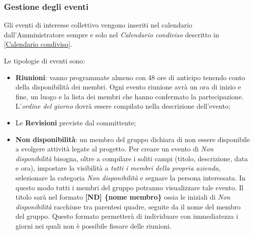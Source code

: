 		\subsubsection{Gestione degli eventi}
		
		Gli eventi di interesse collettivo vengono inseriti nel calendario dall'Amministratore sempre e solo nel \emph{Calendario condiviso} descritto in \ref{Calendario condiviso}.
		
		Le tipologie di eventi sono:
		\begin{itemize}
	  		\item \textbf{Riunioni}: vanno programmate almeno con 48 ore di anticipo tenendo conto della disponibilità dei membri. Ogni evento riunione avrà un ora di inizio e fine, un luogo e la lista dei membri che hanno confermato la partecipazione. L'\emph{ordine del giorno} dovrà essere compilato nella descrizione dell'evento;
	  		\item Le \textbf{Revisioni} previste dal committente;
	  		\item \textbf{Non disponibilità}: un membro del gruppo dichiara di non essere disponibile a svolgere attività legate al progetto. Per creare un evento di \emph{Non disponibilità} bisogna, oltre a compilare i soliti campi (titolo, descrizione, data e ora), impostare la visibilità a \emph{tutti i membri della propria azienda}, selezionare la categoria \emph{Non disponibilità} e segnare la persona interessata. In questo modo tutti i membri del gruppo \GroupName{} potranno visualizzare tale evento. 
	  		Il titolo sarà nel formato \textbf{[ND] \{nome membro\}} ossia le iniziali di \emph{Non disponibilità} racchiuse tra parentesi quadre, seguite da il nome del membro del gruppo. Questo formato permetterà di individuare con immediatezza i giorni nei quali non è possibile fissare delle riunioni.
		\end{itemize}